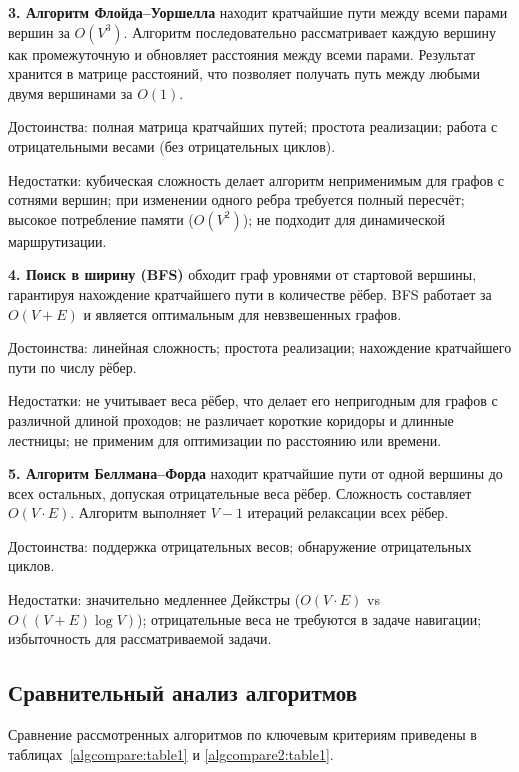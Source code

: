 \textbf{3. Алгоритм Флойда--Уоршелла} находит кратчайшие пути между всеми парами вершин за $O(V^3)$. Алгоритм последовательно рассматривает каждую вершину как промежуточную и обновляет расстояния между всеми парами. Результат хранится в матрице расстояний, что позволяет получать путь между любыми двумя вершинами за $O(1)$.

Достоинства: полная матрица кратчайших путей; простота реализации; работа с отрицательными весами (без отрицательных циклов).

Недостатки: кубическая сложность делает алгоритм неприменимым для графов с сотнями вершин; при изменении одного ребра требуется полный пересчёт; высокое потребление памяти ($O(V^2)$); не подходит для динамической маршрутизации.

\textbf{4. Поиск в ширину (BFS)} обходит граф уровнями от стартовой вершины, гарантируя нахождение кратчайшего пути в количестве рёбер. BFS работает за $O(V + E)$ и является оптимальным для невзвешенных графов.

Достоинства: линейная сложность; простота реализации; нахождение кратчайшего пути по числу рёбер.

Недостатки: не учитывает веса рёбер, что делает его непригодным для графов с различной длиной проходов; не различает короткие коридоры и длинные лестницы; не применим для оптимизации по расстоянию или времени.

\textbf{5. Алгоритм Беллмана--Форда} находит кратчайшие пути от одной вершины до всех остальных, допуская отрицательные веса рёбер. Сложность составляет $O(V \cdot E)$. Алгоритм выполняет $V - 1$ итераций релаксации всех рёбер.

Достоинства: поддержка отрицательных весов; обнаружение отрицательных циклов.

Недостатки: значительно медленнее Дейкстры ($O(V \cdot E)$ vs $O((V+E)\log V)$); отрицательные веса не требуются в задаче навигации; избыточность для рассматриваемой задачи.

\subsection{Сравнительный анализ алгоритмов}

Сравнение рассмотренных алгоритмов по ключевым критериям приведены в таблицах~\ref{algcompare:table1} и \ref{algcompare2:table1}.

